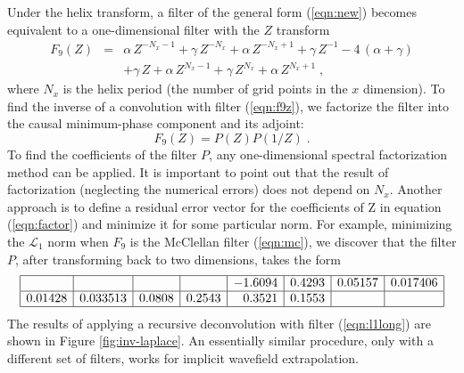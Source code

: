 \par
Under the helix transform, a filter of the general form
(\ref{eqn:new}) becomes equivalent to a one-dimensional filter with
the $Z$ transform
\begin{eqnarray}
\label{eqn:f9z}
F_9 (Z) & = & \alpha\,Z^{-N_x-1} + \gamma\,Z^{-N_x} + \alpha\,Z^{-N_x+1} + \gamma\,Z^{-1} 
-4\,(\alpha + \gamma) \nonumber \\ & & + 
\gamma\,Z + \alpha\,Z^{N_x-1} + \gamma\,Z^{N_x} + \alpha\,Z^{N_x+1}\;,
\end{eqnarray}
where $N_x$ is the helix period (the number of grid points in the $x$
dimension). To find the inverse of a convolution with filter
(\ref{eqn:f9z}), we factorize the filter into the causal minimum-phase
component and its adjoint:
\begin{equation}
\label{eqn:factor}
F_9 (Z) = P (Z) P (1/Z)\;.
\end{equation}
To find the coefficients of the filter $P$, any one-dimensional
spectral factorization method can be applied. It is important to point
out that the result of factorization (neglecting the numerical errors)
does not depend on $N_x$. Another approach is to define a residual
error vector for the coefficients of Z in equation (\ref{eqn:factor})
and minimize it for some particular norm. For example, minimizing the
$\mathcal{L}_1$ norm when $F_9$ is the McClellan filter
(\ref{eqn:mc}), we discover that the filter $P$, after transforming
back to two dimensions, takes the form
\begin{equation}
\label{eqn:l1long}
\begin{array}{|r|r|r|r|r|r|r|r|}
\hline
     &         &           &        &     -1.6094 & 0.4293 & 0.05157 & 0.017406 \\ \hline
0.01428 & 0.033513 & 0.0808 & 0.2543 & 0.3521  & 0.1553 &   &          \\ \hline
\end{array}
\end{equation}
The results of applying a recursive deconvolution with filter
(\ref{eqn:l1long}) are shown in Figure \ref{fig:inv-laplace}.  An
essentially similar procedure, only with a different set of filters,
works for implicit wavefield extrapolation.
  
